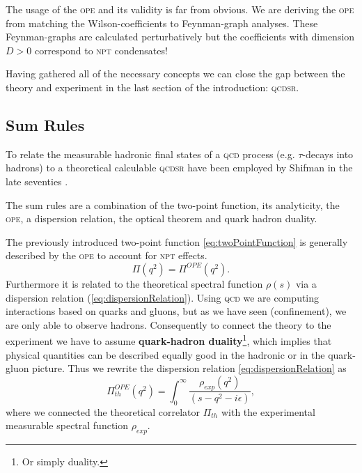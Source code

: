 \documentclass[../../index.tex]{subfiles}
\begin{document}
The usage of the \textsc{ope} and its validity is far from obvious. We are deriving the
\textsc{ope} from matching the Wilson-coefficients to Feynman-graph analyses. These
Feynman-graphs are calculated perturbatively but the coefficients with dimension
$D>0$ correspond to \textsc{npt} condensates!

Having gathered all of the necessary concepts we can close the gap between the
theory and experiment in the last section of the introduction: \textsc{qcdsr}.


\subsection{Sum Rules}
\label{sec:sumRules}
To relate the measurable hadronic final states of a \textsc{qcd} process (e.g.
$\tau$-decays into hadrons) to a theoretical calculable \textsc{qcdsr} have been
employed by Shifman in the late seventies \cite{Shifman1978}.

The sum rules are a combination of the two-point function, its analyticity, the
\textsc{ope}, a dispersion relation, the optical theorem and quark hadron
duality.

The previously introduced two-point function \cref{eq:twoPointFunction} is
generally described by the \textsc{ope} to account for \textsc{npt} effects.
\begin{equation}
  \Pi(q^2) = \Pi^{OPE}(q^2).
\end{equation}
Furthermore it is related to the theoretical spectral function $\rho(s)$ via a
dispersion relation (\cref{eq:dispersionRelation}). Using \textsc{qcd} we are
computing interactions based on quarks and gluons, but as we have seen
(confinement), we are only able to observe hadrons. Consequently to connect the
theory to the experiment we have to assume \textbf{quark-hadron
  duality}\footnote{Or simply duality.}, which implies that physical quantities
can be described equally good in the hadronic or in the quark-gluon picture.
Thus we rewrite the dispersion relation \cref{eq:dispersionRelation} as
\begin{equation}
  \Pi^{OPE}_{th}(q^2) = \int_0^\infty \frac{\rho_{exp}(q^2)}{(s-q^2-i\epsilon)},
\end{equation}
where we connected the theoretical correlator $\Pi_{th}$ with the experimental
measurable spectral function $\rho_{exp}$.
\end{document}
